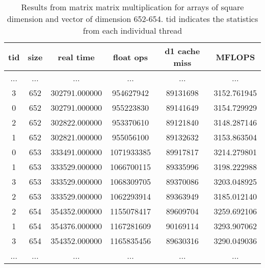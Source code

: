 \documentclass[a4paper,12pt]{article}
\begin{document}
\begin{table}[!ht]
  \centering
  \caption{Results from matrix matrix multiplication for arrays of square dimension and vector of dimension 652-654. tid indicates the statistics from each individual thread}
  \label{tab:dgemm}

  \vspace{3mm}
  \begin{tabular}{ c c c c c c }
    tid	& size & real time & float ops & d1 cache miss & MFLOPS \\ \hline
    ... & ... & ... & ... & ... & ... \\
    3 & 652 & 302791.000000 & 954627942 & 89131698 & 3152.761945  \\
    0 & 652 & 302791.000000 & 955223830 & 89141649 & 3154.729929  \\
    2 & 652 & 302822.000000 & 953370610 & 89121840 & 3148.287146  \\
    1 & 652 & 302821.000000 & 955056100 & 89132632 & 3153.863504  \\
    0 & 653 & 333491.000000 & 1071933385 & 89917817 & 3214.279801 \\
    1 & 653 & 333529.000000 & 1066700115 & 89335996 & 3198.222988 \\
    3 & 653 & 333529.000000 & 1068309705 & 89370086 & 3203.048925 \\
    2 & 653 & 333529.000000 & 1062293914 & 89363949 & 3185.012140 \\
    2 & 654 & 354352.000000 & 1155078417 & 89609704 & 3259.692106 \\
    1 & 654 & 354376.000000 & 1167281609 & 90169114 & 3293.907062 \\
    3 & 654 & 354352.000000 & 1165835456 & 89630316 & 3290.049036 \\
    ... & ... & ... & ... & ... & ...
  \end{tabular}
\end{table}
\end{document}
